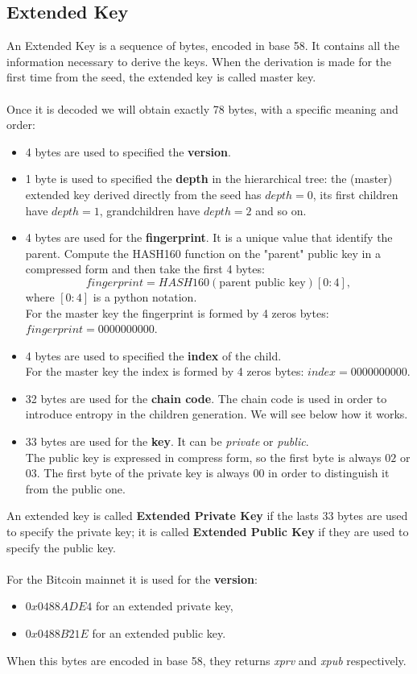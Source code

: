 \subsection{Extended Key}
An Extended Key is a sequence of bytes, encoded in base 58. It contains all the information necessary to derive the keys. When the derivation is made for the first time from the seed, the extended key is called master key.
\\ \\
Once it is decoded we will obtain exactly 78 bytes, with a specific meaning and order:
\begin{itemize}[label=$\circledast$]
	\item 4 bytes are used to specified the \textbf{version}.
	\item 1 byte is used to specified the \textbf{depth} in the hierarchical tree: the (master) extended key derived directly from the seed has $depth=0$, its first children have $depth=1$, grandchildren have $depth=2$ and so on.
	\item 4 bytes are used for the \textbf{fingerprint}. It is a unique value that identify the parent. Compute the HASH160 function on the "parent" public key in a compressed form and then take the first 4 bytes:
	\begin{equation*}
	fingerprint=HASH160(\text{parent public key})[0:4],
	\end{equation*}
	where $[0:4]$ is a python notation.\\
	For the master key the fingerprint is formed by 4 zeros bytes: $fingerprint=0000000000$.
	\item 4 bytes are used to specified the \textbf{index} of the child. \\
	For the master key the index is formed by 4 zeros bytes: $index=0000000000$.
	\item 32 bytes are used for the \textbf{chain code}. The chain code is used in order to introduce entropy in the children generation. We will see below how it works.
	\item 33 bytes are used for the \textbf{key}. It can be \textit{private} or \textit{public}. \\ The public key is expressed in compress form, so the first byte is always $02$ or $03$. The first byte of the private key is always $00$ in order to distinguish it from the public one.\\
\end{itemize}
An extended key is called \textbf{Extended Private Key} if the lasts 33 bytes are used to specify the private key; it is called \textbf{Extended Public Key} if they are used to specify the public key.
\\ \\
For the Bitcoin mainnet it is used for the \textbf{version}: 
\begin{itemize}
	\item $0x0488ADE4$ for an extended private key,
	\item $0x0488B21E$ for an extended public key.
\end{itemize}
When this bytes are encoded in base 58, they returns \textit{xprv} and \textit{xpub} respectively.

